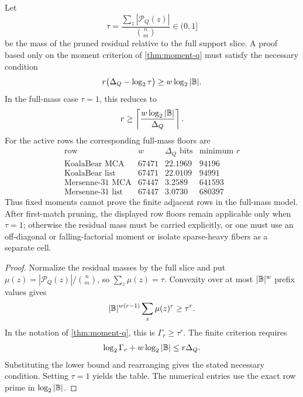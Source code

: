 \documentclass[11pt,a4paper]{amsart}
\numberwithin{equation}{section}
\theoremstyle{remark}
\begin{document}
\begin{proposition}\label{prop:q-moment-order-floor}
Let
\[
        \tau=\frac{\sum_z|\mathcal P_Q(z)|}{\binom nm}\in(0,1]
\]
be the mass of the pruned residual relative to the full support slice.  A proof based only on the moment criterion of \cref{thm:moment-q} must satisfy the necessary condition
\[
        r\bigl(\Delta_Q-\log_2\tau\bigr)
        \ge w\log_2|\mathbb B| .
\]
In the full-mass case \(\tau=1\), this reduces to
\[
        r\ge\left\lceil\frac{w\log_2|\mathbb B|}{\Delta_Q}\right\rceil .
\]
For the active rows the corresponding full-mass floors are
\[
\begin{array}{c|r|r|r}
\text{row} & w & \Delta_Q\text{ bits} & \text{minimum }r\\
\hline
\text{KoalaBear MCA} & 67471 & 22.1969 & 94196\\
\text{KoalaBear list} & 67471 & 22.0109 & 94991\\
\text{Mersenne-31 MCA} & 67447 & 3.2589 & 641593\\
\text{Mersenne-31 list} & 67447 & 3.0730 & 680397
\end{array}
\]
Thus fixed moments cannot prove the finite adjacent rows in the full-mass model.  After first-match pruning, the displayed row floors remain applicable only when \(\tau=1\); otherwise the residual mass must be carried explicitly, or one must use an off-diagonal or falling-factorial moment or isolate sparse-heavy fibers as a separate cell.
\end{proposition}

\begin{proof}
Normalize the residual masses by the full slice and put
\(\mu(z)=|\mathcal P_Q(z)|/\binom nm\), so \(\sum_z\mu(z)=\tau\).  Convexity over at most \(|\mathbb B|^w\) prefix values gives
\[
        |\mathbb B|^{w(r-1)}\sum_z\mu(z)^r\ge\tau^r.
\]
In the notation of \cref{thm:moment-q}, this is \(\Gamma_r\ge\tau^r\).  The finite criterion requires
\[
        \log_2\Gamma_r+w\log_2|\mathbb B|\le r\Delta_Q .
\]
Substituting the lower bound and rearranging gives the stated necessary condition.  Setting \(\tau=1\) yields the table.  The numerical entries use the exact row prime in \(\log_2|\mathbb B|\).
\end{proof}
\end{document}
